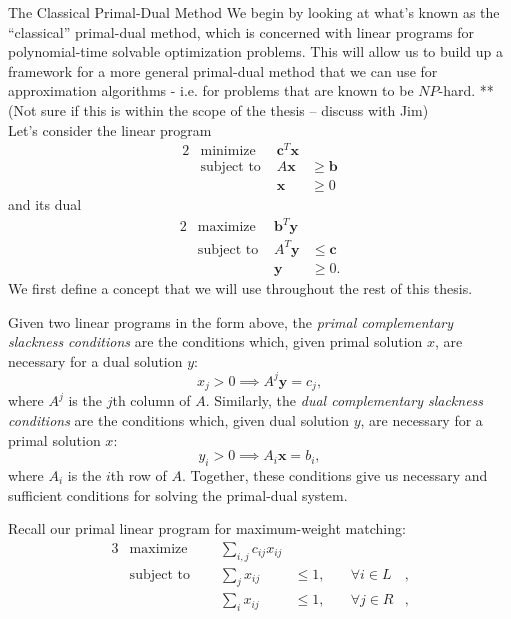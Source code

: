 \documentclass[11pt]{article}
\renewcommand{\'}{^{'}}
\newenvironment{definition}[2][Definition]{\begin{trivlist}
\item[\hskip \labelsep {\bfseries #1}\hskip \labelsep {\bfseries #2.}]}{\end{trivlist}}
\begin{document}
\begin{section}{The Classical Primal-Dual Method}
	We begin by looking at what's known as the ``classical'' primal-dual method, which is concerned 
	with linear programs for polynomial-time solvable optimization problems. This will allow us 
	to build up a framework for a more general primal-dual method that we can use for approximation 
	algorithms - i.e. for problems that are known to be $NP$-hard. **(Not sure if this is within the 
	scope of the thesis -- discuss with Jim)\\
	Let's consider the linear program
	\begin{alignat}{2}
		& \text{minimize} & \mathbf{c}^{T}\mathbf{x} \\
		& \text{subject to } & A\mathbf{x} & \geq \mathbf{b} \\
		&& \mathbf{x} & \geq 0
	\end{alignat}
	and its dual
	\begin{alignat}{2}
		& \text{maximize} & \mathbf{b}^{T}\mathbf{y} \\
		& \text{subject to } & A^{T}\mathbf{y} & \leq \mathbf{c} \\
		&& \mathbf{y} & \geq 0.
	\end{alignat}
	We first define a concept that we will use throughout the rest of this thesis. 
	\begin{definition}{(Complementary slackness)}
		Given two linear programs in the form above, the \emph{primal complementary slackness 
		conditions} are the conditions which, given primal solution $x$, are necessary for 
		a dual solution $y$:
		\[
			x_j > 0 \implies A^{j}\mathbf{y} = c_j,
		\]
		where $A^{j}$ is the $j$th column of $A$. Similarly, the \emph{dual complementary 
		slackness conditions} are the conditions which, given dual solution $y$, are 
		necessary for a primal solution $x$:
		\[
			y_i > 0 \implies A_i\mathbf{x} = b_i,
		\]
		where $A_i$ is the $i$th row of $A$. Together, these conditions give us necessary and 
		sufficient conditions for solving the primal-dual system.
	\end{definition}
	Recall our primal linear program for maximum-weight matching:
	\begin{alignat}{3}
		& \text{maximize } & \sum_{i,j} c_{ij} x_{ij}& \\
		& \text{subject to } \quad & \sum_{j} x_{ij} & \leq 1, & \quad \forall i\in L&, \\
				     &\quad & \sum_{i} x_{ij} & \leq 1, & \quad \forall j\in R &, \\

\end{alignat}
\end{section}
\end{document}
